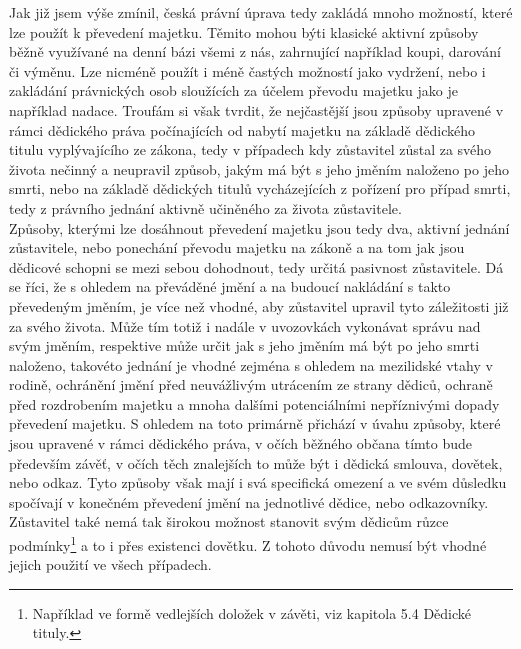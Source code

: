 \documentclass{article}
\begin{document}
Jak již jsem výše zmínil, česká právní úprava tedy zakládá mnoho možností, které lze použít k převedení majetku. Těmito mohou býti klasické aktivní způsoby běžně využívané na denní bázi všemi z nás, zahrnující například koupi, darování či výměnu. Lze nicméně použít i méně častých možností jako vydržení, nebo i zakládání právnických osob sloužících za účelem převodu majetku jako je například nadace. Troufám si však tvrdit, že nejčastější jsou způsoby upravené v rámci dědického práva počínajících od nabytí majetku na základě dědického titulu vyplývajícího ze zákona, tedy v případech kdy zůstavitel zůstal za svého života nečinný a neupravil způsob, jakým má být s jeho jměním naloženo po jeho smrti, nebo na základě dědických titulů vycházejících z pořízení pro případ smrti, tedy z právního jednání aktivně učiněného za života zůstavitele. \\

Způsoby, kterými lze dosáhnout převedení majetku jsou tedy dva, aktivní jednání zůstavitele, nebo ponechání převodu majetku na zákoně a na tom jak jsou dědicové schopni se mezi sebou dohodnout, tedy určitá pasivnost zůstavitele. Dá se říci, že s ohledem na převáděné jmění a na budoucí nakládání s takto převedeným jměním, je více než vhodné, aby zůstavitel upravil tyto záležitosti již za svého života. Může tím totiž i nadále v uvozovkách vykonávat správu nad svým jměním, respektive může určit jak s jeho jměním má být po jeho smrti naloženo, takovéto jednání je vhodné zejména s ohledem na mezilidské vtahy v rodině, ochránění jmění před neuvážlivým utrácením ze strany dědiců, ochraně před rozdrobením majetku a mnoha dalšími potenciálními nepříznivými dopady převedení majetku. S ohledem na toto primárně přichází v úvahu způsoby, které jsou upravené v rámci dědického práva, v očích běžného občana tímto bude především závěť, v očích těch znalejších to může být i dědická smlouva, dovětek, nebo odkaz. Tyto způsoby však mají i svá specifická omezení a ve svém důsledku spočívají v konečném převedení jmění na jednotlivé dědice, nebo odkazovníky. Zůstavitel také nemá tak širokou možnost stanovit svým dědicům růzce podmínky\footnote{Například ve formě vedlejších doložek v závěti, viz kapitola 5.4 Dědické tituly.} a to i přes existenci dovětku. Z tohoto důvodu nemusí být vhodné jejich použití ve všech případech. \\

\end{document}
